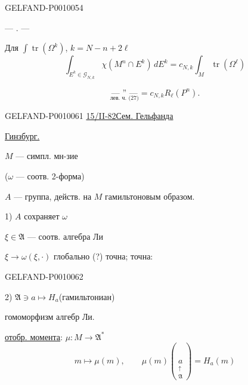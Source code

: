 \begin{GelfandAdjacentEvidence}{GELFAND-P001005}{4}
\begin{center}--- . ---\end{center}
Для $\displaystyle\int\operatorname{tr}(\Omega^k)$, $k=N-n+2\ell$
\begin{equation*}
\int_{E^k\in\mathcal G_{N,k}}\chi(M^n\cap E^k)\,dE^k
=c_{N,k}\int_M\operatorname{tr}(\Omega^\ell) \tag{28}
\end{equation*}
\end{GelfandAdjacentEvidence}

\begin{equation*}
\underset{\text{лев. ч. (27)}}{\text{--- '' ---}}=c_{N,k}R_\ell(P^n). \tag{29}
\end{equation*}


\begin{GelfandAdjacentEvidence}{GELFAND-P001006}{1}
\underline{15/II-82}\qquad \underline{Сем. Гельфанда}

\underline{Гинзбург.}

$M$ --- симпл. мн-зие

($\omega$ --- соотв. 2-форма)

$A$ --- группа, действ. на $M$ гамильтоновым образом.

1) $A$ сохраняет $\omega$

$\xi\in\mathfrak A$ --- соотв. алгебра Ли

$\xi\longrightarrow\omega(\xi,\cdot)$ глобально (?) точна; точна:
\end{GelfandAdjacentEvidence}
\begin{GelfandAdjacentEvidence}{GELFAND-P001006}{2}


2) $\mathfrak A\ni a\longmapsto H_a$\quad (гамильтониан)

гомоморфизм алгебр Ли.

\underline{отобр. момента}: $\mu\colon M\longrightarrow\mathfrak A^*$
\[
m\longmapsto\mu(m),\qquad
\mu(m)(\underset{\substack{\uparrow\\\mathfrak A}}{a})=H_a(m)
\]
\end{GelfandAdjacentEvidence}


